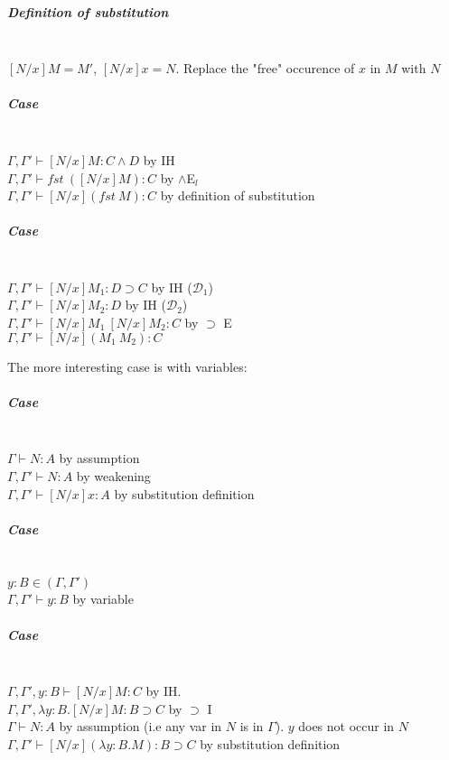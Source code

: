 \documentclass[12 pt]{article}
\begin{document}
    \subparagraph{Definition of substitution}
    ~\\$[N/x]M = M'$, $[N/x] x = N$. Replace the "free" occurence of
    $x$ in $M$ with $N$
    
    \subparagraph{Case}
    \noLine
    \DP
    \\ $\Gamma, \Gamma ' \vdash [N/x] M : C\land D$ by IH
    \\ $\Gamma, \Gamma ' \vdash fst\ ([N/x]M) : C$ by $\land$E$_l$
    \\$\Gamma, \Gamma' \vdash [N/x](fst \ M) : C$ by definition of substitution
    \subparagraph{Case}
    \noLine
    
    \noLine
    \DP
    \\ $\Gamma, \Gamma ' \vdash [N/x] M_1 : D \supset C$ by IH ($\mathcal{D}_1$)
    \\ $\Gamma, \Gamma ' \vdash [N/x] M_2 : D$ by IH ($\mathcal{D}_2$)
    \\$\Gamma, \Gamma' \vdash [N/x]M_1 \ [N/x]M_2 : C$ by $\supset$ E
    \\ $\Gamma, \Gamma' \vdash [N/x](M_1\ M_2) : C$

    The more interesting case is with variables:
    \subparagraph{Case}
    
    \DP
    \\ $\Gamma \vdash N:A$ by assumption
    \\ $\Gamma, \Gamma' \vdash N : A$ by weakening
    \\ $\Gamma, \Gamma' \vdash [N/x]x : A$ by substitution definition
    \subparagraph{Case}
    
    \DP
    \\ $y:B \in (\Gamma, \Gamma')$
    \\ $\Gamma, \Gamma' \vdash y : B$ by variable
    \subparagraph{Case}
    
    \DP
    \\ $\Gamma, \Gamma', y:B \vdash [N/x] M:C$ by IH.
    \\ $\Gamma, \Gamma', \lambda y : B . [N/x] M: B \supset C$ by $\supset$ I 
    \\ $\Gamma \vdash N : A$ by assumption (i.e any var in $N$ is in
    $\Gamma$). $y$ does not occur in $N$
    \\ $\Gamma, \Gamma ' \vdash [N/x] (\lambda y:B.M) : B \supset C$
    by substitution definition
\end{document}

